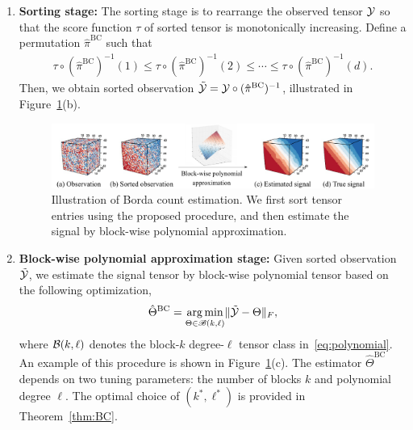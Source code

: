 \documentclass[12pt]{article}
\theoremstyle{definition}
\def\caliB{\mathscr{B}}
\begin{document}
\begin{enumerate}[wide, labelwidth=0pt, labelindent=0pt]
  \item {\bf Sorting stage:} The sorting stage is to rearrange the observed tensor $\mathcal{Y}$ so that the score function $\tau$ of sorted tensor is  monotonically increasing. Define a permutation $\hat\pi^{\text{BC}}$ such that
    \begin{align}\label{eq:permute}
        \tau \circ (\hat\pi^{\text{BC}})^{-1}(1) \leq  \tau\circ (\hat\pi^{\text{BC}})^{-1}(2)
        \leq \cdots 
        \leq
        \tau\circ (\hat\pi^{\text{BC}})^{-1}(d).
    \end{align}
    Then, we obtain sorted observation $\tilde{\mathcal{Y}} = \mathcal{Y} \circ (\hat\pi^{\text{BC}})^{-1}$, illustrated in Figure~\ref{fig:borda}(b).
\begin{figure}[t]
    \centering
    \includegraphics[width = \textwidth]{figure/Borda2.pdf}
    \caption{Illustration of Borda count estimation. We first sort tensor entries using the proposed procedure, and then estimate the signal by block-wise polynomial approximation.}
    \label{fig:borda}
\end{figure}

 \item {\bf  Block-wise polynomial approximation stage:} Given sorted observation $\tilde {\mathcal{Y}} $, we estimate the signal tensor by block-wise polynomial tensor based on the following optimization,
    \begin{align}\label{eq:bclse}
        \hat\Theta^{\text{BC}} = \argmin_{\Theta\in\caliB(k,\ell)}\FnormSize{}{\tilde\tY-\Theta},
    \end{align}
    where $\mathcal{B}(k,\ell)$ denotes the block-$k$ degree-$\ell$ tensor class  in~\eqref{eq:polynomial}. An example of this procedure is shown in Figure~\ref{fig:borda}(c). The estimator $\hat\Theta^{\text{BC}}$ depends on two tuning parameters: the number of blocks $k$ and polynomial degree $\ell$. The optimal choice of $(k^*,\ell^*)$ is provided in Theorem~\ref{thm:BC}.
  \end{enumerate}
\end{document}
